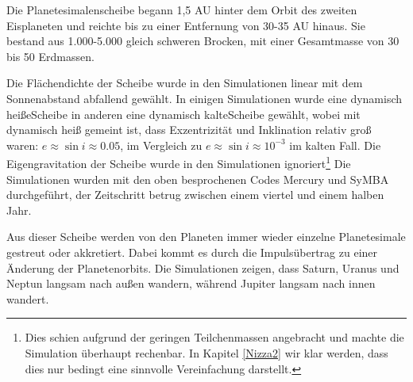 \documentclass[12pt,a4paper,twoside]{article}
\renewcommand{\cite}{\citep}
\begin{document}
Die Planetesimalenscheibe begann 1,5 AU hinter dem Orbit des zweiten Eisplaneten und reichte bis zu einer Entfernung von 30-35 AU hinaus\cite{Tsiganis2005,Levison2008}. Sie bestand aus 1.000-5.000 gleich schweren Brocken, mit einer Gesamtmasse von 30 bis 50 Erdmassen.

Die Flächendichte der Scheibe wurde in den Simulationen linear mit dem Sonnenabstand abfallend gewählt. In einigen Simulationen wurde eine \glqq dynamisch heiße\grqq Scheibe in anderen eine \glqq dynamisch kalte\grqq Scheibe gewählt, wobei mit dynamisch heiß gemeint ist, dass Exzentrizität und Inklination relativ groß waren: $e \approx \sin i \approx 0.05 $, im Vergleich zu $e \approx \sin i \approx 10^{-3} $ im kalten Fall\cite{Tsiganis2005}.
Die Eigengravitation der Scheibe wurde in den Simulationen ignoriert\cite{Tsiganis2005}\footnote{Dies schien aufgrund der geringen Teilchenmassen angebracht und machte die Simulation überhaupt rechenbar. In Kapitel \ref{Nizza2} wir klar werden, dass dies nur bedingt eine sinnvolle Vereinfachung darstellt.}
Die Simulationen wurden mit den oben besprochenen Codes Mercury und SyMBA durchgeführt,
der Zeitschritt betrug zwischen einem viertel und einem halben Jahr\cite{Tsiganis2005}.

Aus dieser Scheibe werden von den Planeten immer wieder einzelne Planetesimale gestreut oder akkretiert. Dabei kommt es durch die Impulsübertrag zu einer Änderung der Planetenorbits\cite{Tsiganis2005}.
Die Simulationen zeigen, dass Saturn, Uranus und Neptun langsam nach außen wandern, während Jupiter langsam nach innen wandert\cite{Hahn1999,Tsiganis2005}.
\end{document}
